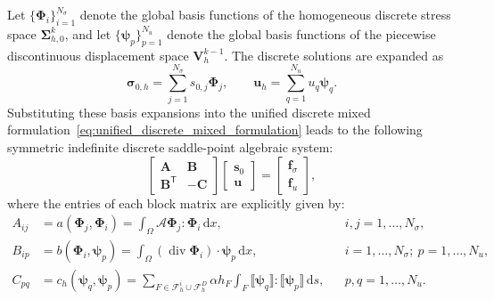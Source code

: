 Let $\{\boldsymbol{\Phi}_i\}_{i=1}^{N_\sigma}$ denote the global basis functions of the homogeneous discrete stress space $\boldsymbol{\Sigma}_{h,0}^k$, and let $\{\boldsymbol{\psi}_p\}_{p=1}^{N_u}$ denote the global basis functions of the piecewise discontinuous displacement space $\boldsymbol{V}_h^{k-1}$. The discrete solutions are expanded as
\[
\boldsymbol{\sigma}_{0,h} = \sum_{j=1}^{N_\sigma} s_{0,j} \boldsymbol{\Phi}_j, \qquad \boldsymbol{u}_h = \sum_{q=1}^{N_u} u_q \boldsymbol{\psi}_q.
\]
Substituting these basis expansions into the unified discrete mixed formulation~\eqref{eq:unified_discrete_mixed_formulation} leads to the following symmetric indefinite discrete saddle-point algebraic system:
\begin{equation}
\label{eq:matrix_saddle_point}
\begin{bmatrix}
\boldsymbol{A} & \boldsymbol{B} \\
\boldsymbol{B}^{\mathsf T} & -\boldsymbol{C}
\end{bmatrix}
\begin{bmatrix}
\boldsymbol{s}_0 \\
\boldsymbol{u}
\end{bmatrix}
=
\begin{bmatrix}
\boldsymbol{f}_{\sigma} \\
\boldsymbol{f}_u
\end{bmatrix},
\end{equation}
where the entries of each block matrix are explicitly given by:
\begin{equation}
\label{eq:saddle_blocks}
\begin{aligned}
A_{ij} &= a(\boldsymbol{\Phi}_j, \boldsymbol{\Phi}_i) = \int_\Omega \mathcal{A}\boldsymbol{\Phi}_j : \boldsymbol{\Phi}_i \,\mathrm{d}x, && i,j = 1, \dots, N_\sigma, \\
B_{ip} &= b(\boldsymbol{\Phi}_i, \boldsymbol{\psi}_p) = \int_\Omega (\operatorname{div}\boldsymbol{\Phi}_i) \cdot \boldsymbol{\psi}_p \,\mathrm{d}x, && i = 1, \dots, N_\sigma; \ p = 1, \dots, N_u, \\
C_{pq} &= c_h(\boldsymbol{\psi}_q, \boldsymbol{\psi}_p) = \sum_{F \in \mathcal{F}_h^i \cup \mathcal{F}_h^D} \alpha h_F \int_F \llbracket \boldsymbol{\psi}_q \rrbracket : \llbracket \boldsymbol{\psi}_p \rrbracket \,\mathrm{d}s, && p,q = 1, \dots, N_u.
\end{aligned}
\end{equation}

